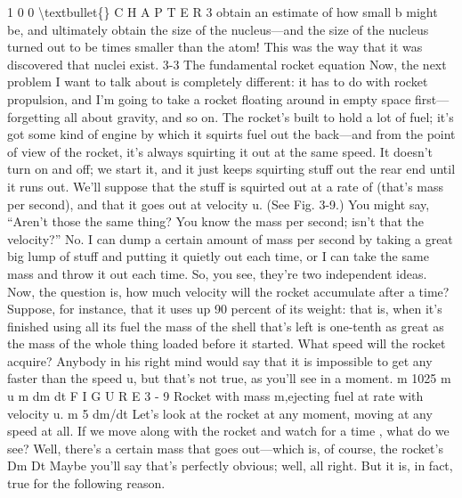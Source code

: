 \documentclass[10pt,oneside]{article}
\begin{document}
1 0 0 \textbackslash{}textbullet\{\} C H A P T E R  3 obtain an estimate of how small b might be, and ultimately obtain the size of the nucleus---and the size of the nucleus turned out to be times smaller than the atom! This was the way that it was discovered that nuclei exist. 3-3 The fundamental rocket equation Now, the next problem I want to talk about is completely different: it has to do with rocket propulsion, and I’m going to take a rocket floating around in empty space first---forgetting all about gravity, and so on. The rocket’s built to hold a lot of fuel; it’s got some kind of engine by which it squirts fuel out the back---and from the point of view of the rocket, it’s always squirting it out at the same speed. It doesn’t turn on and off; we start it, and it just keeps squirting stuff out the rear end until it runs out. We’ll suppose that the stuff is squirted out at a rate of (that’s mass per second), and that it goes out at velocity u. (See Fig. 3-9.) You might say, “Aren’t those the same thing? You know the mass per second; isn’t that the velocity?” No. I can dump a certain amount of mass per second by taking a great big lump of stuff and putting it quietly out each time, or I can take the same mass and throw it out each time. So, you see, they’re two independent ideas. Now, the question is, how much velocity will the rocket accumulate after a time? Suppose, for instance, that it uses up 90 percent of its weight: that is, when it’s finished using all its fuel the mass of the shell that’s left is one-tenth as great as the mass of the whole thing loaded before it started. What speed will the rocket acquire? Anybody in his right mind would say that it is impossible to get any faster than the speed u, but that’s not true, as you’ll see in a moment. m 1025 m u m  dm dt F I G U R E 3 - 9 Rocket with mass m,ejecting fuel at rate with velocity u. m 5 dm/dt Let’s look at the rocket at any moment, moving at any speed at all. If we move along with the rocket and watch for a time , what do we see? Well, there’s a certain mass that goes out---which is, of course, the rocket’s Dm Dt Maybe you’ll say that’s perfectly obvious; well, all right. But it is, in fact, true for the following reason.\par
\end{document}
